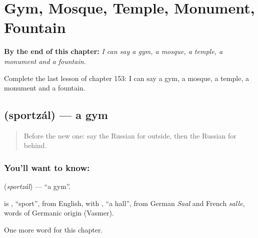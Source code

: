 
\chapter{Gym, Mosque, Temple, Monument, Fountain}
\label{ch:ru-gym-mosque-temple-monument-fountain}

\begin{chapteropening}
\textbf{By the end of this chapter:} \emph{I can say a gym, a mosque, a temple, a monument and a fountain.}

Complete the last lesson of chapter 153: I can say a gym, a mosque, a temple, a monument and a fountain.
\end{chapteropening}

\section[\texorpdfstring{\ru{спортзал} (sportzál)}{спортзал (sportzál)}]{ (sportzál) — a gym}

\label{lesson:RU-C153-sportzal}



\begin{quote}
Before the new one: say the Russian for outside, then the Russian for behind.
\end{quote}

\subsection*{You'll want to know: }
\textbf{} (\emph{sportzál}) — \textquotedblleft{}a gym\textquotedblright{}.

\begin{cousinweb}
\textbf{} is \emph{}, \textquotedblleft{}sport\textquotedblright{}, from English, with \emph{}, \textquotedblleft{}a hall\textquotedblright{}, from German \emph{Saal} and French \emph{salle}, words of Germanic origin (Vasmer).
\end{cousinweb}

\begin{grammarlens}[title={What you've built}]
One more word for this chapter.
\end{grammarlens}

